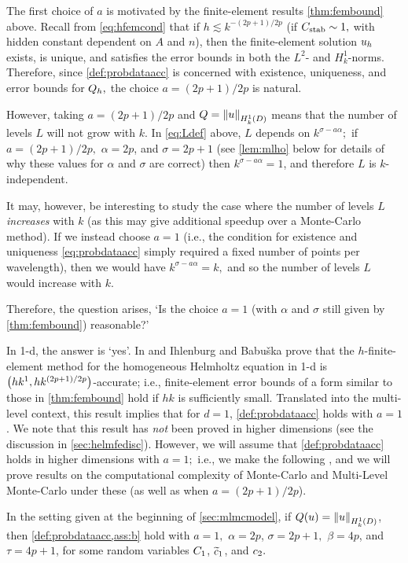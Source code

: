 The first choice of $a$ is motivated by the finite-element results \cref{thm:fembound} above. Recall from \cref{eq:hfemcond} that if $h \lesssim k^{-(2p+1)/2p}$ (if $C_{\mathrm{stab}} \sim 1,$ with hidden constant dependent on $A$ and $n$), then the finite-element solution $u_{h}$ exists, is unique, and satisfies the error bounds in both the $L^2$- and $H^1_k$-norms. Therefore, since \cref{def:probdataacc} is concerned with existence, uniqueness, and error bounds for $Q_{h},$ the choice $a=(2p+1)/2p$ is natural.

However, taking $a=(2p+1)/2p$ and $Q = \NHokD{u}$ means that the number of levels $L$ will not grow with $k.$ In \cref{eq:Ldef} above, $L$ depends on $k^{\sigma-a\alpha};$ if $a=(2p+1)/2p,$ $\alpha = 2p$, and $\sigma = 2p+1$ (see \cref{lem:mlho} below for details of why these values for $\alpha$ and $\sigma$ are correct) then $k^{\sigma-a\alpha} = 1$, and therefore $L$ is $k$-independent.

It may, however, be interesting to study the case where the number of levels $L$ \emph{increases} with $k$ (as this may give additional speedup over a Monte-Carlo method). If we instead choose $a=1$ (i.e., the condition for existence and uniqueness \cref{eq:probdataacc} simply required a fixed number of points per wavelength), then we would have $k^{\sigma - a\alpha} = k,$ and so the number of levels $L$ would increase with $k.$ 

Therefore, the question arises, `Is the choice $a=1$ (with $\alpha$ and $\sigma$ still given by \cref{thm:fembound}) reasonable?'

In 1-d, the answer is `yes'. In \cite[Corollary 3.2]{IhBa:97} and \cite[Theorem 4.27 and equation 4.7.41]{Ih:98} Ihlenburg and Babu\v{s}ka prove that the $h$-finite-element method for the homogeneous Helmholtz equation in 1-d is $\hk{1}{(2p+1)/2p}$-accurate; i.e., finite-element error bounds of a form similar to those in \cref{thm:fembound} hold if $hk$ is sufficiently small. Translated into the multi-level context, this result implies that for $d=1$, \cref{def:probdataacc} holds with $a=1$. We note that this result has \emph{not} been proved in higher dimensions (see the discussion in \cref{sec:helmfedisc}). However, we will assume that \cref{def:probdataacc} holds in higher dimensions with $a=1;$ i.e., we make the following , and we will prove results on the computational complexity of Monte-Carlo and Multi-Level Monte-Carlo under these  (as well as when $a=(2p+1)/2p$).

\bas[Assumptions for $Q(u) = \NHokD{u}$ with $a=1$]\label{ass:mlho}
In the setting given at the beginning of \cref{sec:mlmcmodel}, if $Q(u) = \NHokD{u}$, then \cref{def:probdataacc,ass:b} hold with $a=1,$ $\alpha = 2p$, $\sigma = 2p+1,$ $\beta = 4p$, and $\tau = 4p+1$, for some random variables $C_{1}$, $\widetilde{c}_{1}$, and $c_{2}.$
\eas

